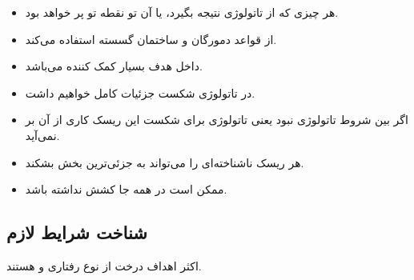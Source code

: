 \begin{itemize}
    \item هر چیزی که از تاتولوژی نتیجه بگیرد،  یا  آن تو نقطه تو
    پر خواهد بود.
    \item از قواعد دمورگان و ساختمان گسسته استفاده می‌کند.
    \item داخل هدف بسیار کمک کننده می‌باشد.
    \item در تاتولوژی شکست جزئیات کامل خواهیم داشت.
    \item اگر بین شروط تاتولوژی نبود یعنی تاتولوژی برای شکست این ریسک کاری از آن
    بر نمی‌آید.
    \item هر ریسک ناشناخته‌ای را می‌تواند به جزئی‌ترین بخش بشکند.
    \item ممکن است در همه جا کشش نداشته باشد.
\end{itemize}

\subsection{شناخت شرایط لازم}

اکثر اهداف درخت از نوع رفتاری  و  هستند.



